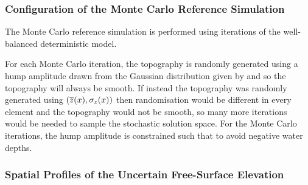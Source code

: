 \subsubsection{Configuration of the Monte Carlo Reference Simulation}
The Monte Carlo reference simulation is performed using iterations of the well-balanced deterministic model.

For each Monte Carlo iteration, the topography is randomly generated using a hump amplitude drawn from the Gaussian distribution given by \rev{$(\humpmean, \sigma_\hump)$} and so the topography will always be smooth.
If instead the topography was randomly generated using $(\overline{z}(x), \sigma_z(x))$ then randomisation would be different in every element and the topography would not be smooth, so many more iterations would be needed to sample the stochastic solution space.
For the Monte Carlo iterations, the hump amplitude \rev{$\hump$} is constrained such that  to avoid negative water depths.

\subsubsection{Spatial Profiles of the Uncertain Free-Surface Elevation}

